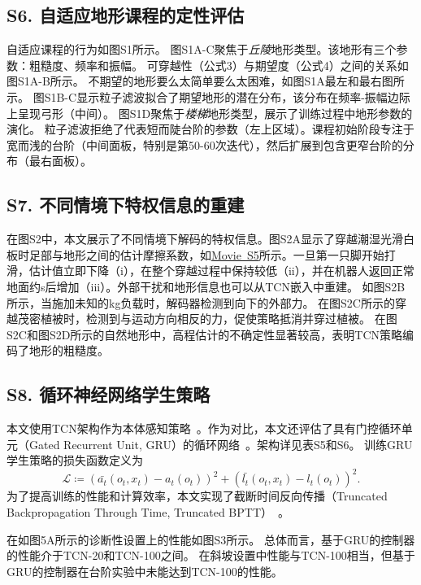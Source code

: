 \documentclass[9pt,twocolumn,twoside]{osajnl}
\begin{document}
\subsection*{S6. 自适应地形课程的定性评估}
自适应课程的行为如图S1所示。
图S1A-C聚焦于\textit{丘陵}地形类型。该地形有三个参数：粗糙度、频率和振幅。
可穿越性（公式3）与期望度（公式4）之间的关系如图S1A-B所示。
不期望的地形要么太简单要么太困难，如图S1A最左和最右图所示。
图S1B-C显示粒子滤波拟合了期望地形的潜在分布，该分布在频率-振幅边际上呈现弓形（中间）。
图S1D聚焦于\textit{楼梯}地形类型，展示了训练过程中地形参数的演化。
粒子滤波拒绝了代表短而陡台阶的参数（左上区域）。课程初始阶段专注于宽而浅的台阶（中间面板，特别是第50-60次迭代），然后扩展到包含更窄台阶的分布（最右面板）。

\subsection*{S7. 不同情境下特权信息的重建}
在图S2中，本文展示了不同情境下解码的特权信息。图S2A显示了穿越潮湿光滑白板时足部与地形之间的估计摩擦系数，如\href{https://youtu.be/aMPwB3t4idU}{Movie~S5}所示。一旦第一只脚开始打滑，估计值立即下降（i），在整个穿越过程中保持较低（ii），并在机器人返回正常地面约\unit[2]{s}后增加（iii）。外部干扰和地形信息也可以从TCN嵌入中重建。
如图S2B所示，当施加未知的\unit[10]{kg}负载时，解码器检测到向下的外部力。
在图S2C所示的穿越茂密植被时，检测到与运动方向相反的力，促使策略抵消并穿过植被。
在图S2C和图S2D所示的自然地形中，高程估计的不确定性显著较高，表明TCN策略编码了地形的粗糙度。


\subsection*{S8. 循环神经网络学生策略}

本文使用TCN架构作为本体感知策略~\cite{bai2018empirical}。作为对比，本文还评估了具有门控循环单元（Gated Recurrent Unit, GRU）的循环网络~\cite{chung2014empirical}。架构详见表S5和S6。
训练GRU学生策略的损失函数定义为
\begin{equation}
\mathcal{L} \coloneqq (\bar{a_t}(o_t, x_t) - a_t(o_t))^2 +  (\bar{l_t}(o_t, x_t) - l_t(o_t))^2.
\end{equation}
为了提高训练的性能和计算效率，本文实现了截断时间反向传播（Truncated Backpropagation Through Time, Truncated BPTT）~\cite{williams1990efficient}。

在如图5A所示的诊断性设置上的性能如图S3所示。
总体而言，基于GRU的控制器的性能介于TCN-20和TCN-100之间。
在斜坡设置中性能与TCN-100相当，但基于GRU的控制器在台阶实验中未能达到TCN-100的性能。
\end{document}
